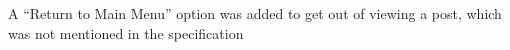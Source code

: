 \documentclass{article}
\begin{document}
A ``Return to Main Menu'' option was added to get out of viewing a post, which was not mentioned in the specification
\end{document}
